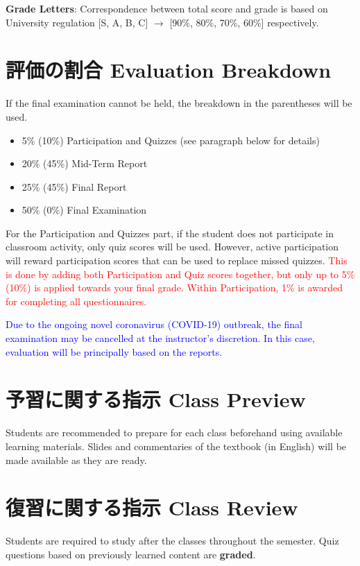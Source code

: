 \documentclass{article}
\begin{document}
\smallskip\noindent
\textbf{Grade Letters}: Correspondence between total score and grade is based on University regulation [S, A, B, C] $\rightarrow$ [90\%, 80\%, 70\%, 60\%] respectively.

\section{評価の割合 Evaluation Breakdown}
If the final examination cannot be held, the breakdown in the parentheses will be used.

\begin{itemize}
    \item 5\% (10\%) Participation and Quizzes (see paragraph below for details)
    \item 20\% (45\%) Mid-Term Report
    \item 25\% (45\%) Final Report
    \item 50\% (0\%) Final Examination
\end{itemize}

For the Participation and Quizzes part, if the student does not participate in classroom activity, only quiz scores will be used. However, active participation will reward participation scores that can be used to replace missed quizzes. \textcolor{red}{This is done by adding both Participation and Quiz scores together, but only up to 5\% (10\%) is applied towards your final grade. Within Participation, 1\% is awarded for completing all questionnaires.}

\textcolor{blue}{Due to the ongoing novel coronavirus (COVID-19) outbreak, the final examination may be cancelled at the instructor's discretion. In this case, evaluation will be principally based on the reports.}

\section{予習に関する指示 Class Preview}
Students are recommended to prepare for each class beforehand using available learning materials. Slides and commentaries of the textbook (in English) will be made available as they are ready.

\section{復習に関する指示 Class Review}
Students are required to study after the classes throughout the semester. Quiz questions based on previously learned content are \textbf{graded}.
\end{document}
